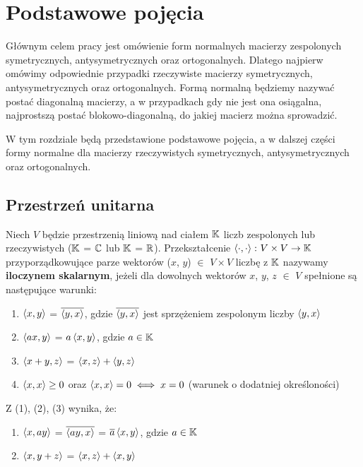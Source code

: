 \chapter{Podstawowe pojęcia}

Głównym celem pracy jest omówienie form normalnych macierzy zespolonych symetrycznych, antysymetrycznych oraz ortogonalnych.
Dlatego najpierw omówimy odpowiednie przypadki rzeczywiste macierzy symetrycznych, antysymetrycznych oraz ortogonalnych.
Formą normalną będziemy nazywać postać diagonalną macierzy, a w przypadkach gdy nie jest ona osiągalna, najprostszą postać blokowo-diagonalną, do jakiej macierz można sprowadzić. 

W tym rozdziale będą przedstawione podstawowe pojęcia, a w dalszej części formy normalne dla macierzy rzeczywistych symetrycznych, antysymetrycznych oraz ortogonalnych.

\section{Przestrzeń unitarna}

Niech $V$ będzie przestrzenią liniową nad ciałem $\mathbb{K}$ liczb zespolonych lub rzeczywistych ($\mathbb{K}$ = $\mathbb{C}$ lub $\mathbb{K}$ = $\mathbb{R}$). Przekształcenie $\left\langle \cdot, \cdot \right\rangle \colon V \times V \to \mathbb{K}$ przyporządkowujące parze wektorów ($x$, $y$) $\in$ $V \times V$ liczbę z $\mathbb{K}$ nazywamy \textbf{iloczynem skalarnym}, jeżeli dla dowolnych wektorów $x$, $y$, $z$ $\in$ $V$ spełnione są następujące warunki:

\begin{enumerate}[leftmargin=1cm, itemsep=2pt, label=(\arabic*)]
    \item $\left\langle x, y \right\rangle$ = $\overline{\left\langle y, x \right\rangle}$, gdzie $\overline{\left\langle y, x \right\rangle}$ jest sprzężeniem zespolonym liczby $\left\langle y, x \right\rangle$
    \item $\left\langle ax, y \right\rangle$ = $a\left\langle x, y \right\rangle$, gdzie $a \in \mathbb{K}$
    \item $\left\langle x + y, z \right\rangle$ = $\left\langle x, z \right\rangle + \left\langle y, z \right\rangle$
    \item $\left\langle x, x \right\rangle \geq 0$ oraz $\left\langle x, x \right\rangle = 0 \iff x = 0$ (warunek o dodatniej określoności)
\end{enumerate}
Z (1), (2), (3) wynika, że:
\begin{enumerate}[leftmargin=1cm, itemsep=2pt, label=(\arabic*), start=5]
    \item $\left\langle x, ay \right\rangle$ = $\overline{\left\langle ay, x \right\rangle}$ = $\overline{a}\left\langle x, y \right\rangle$, gdzie $a \in \mathbb{K}$
    \item $\left\langle x, y + z \right\rangle$ = $\left\langle x, z \right\rangle + \left\langle x, y \right\rangle$
\end{enumerate}

